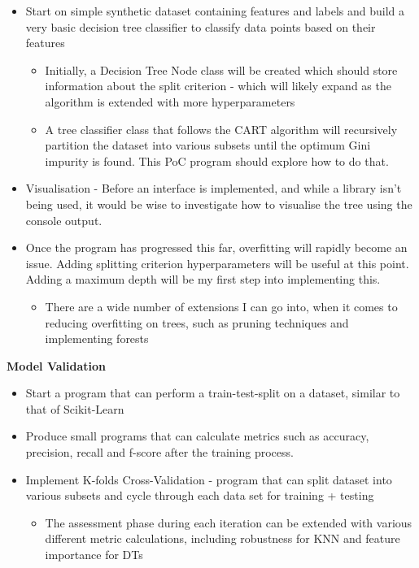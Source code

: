 \documentclass[letterpaper,10pt]{article}
\begin{document}
\begin{itemize}
    \item Start on simple synthetic dataset containing features and labels and build a very basic decision tree classifier to classify data points based on their features
    \begin{itemize}
        \item Initially, a Decision Tree Node class will be created which should store information about the split criterion - which will likely expand as the algorithm is extended with more hyperparameters
        \item A tree classifier class that follows the CART algorithm will recursively partition the dataset into various subsets until the optimum Gini impurity is found. This PoC program should explore how to do that.
    \end{itemize}
    \item Visualisation - Before an interface is implemented, and while a library isn't being used, it would be wise to investigate how to visualise the tree using the console output.
    \item Once the program has progressed this far, overfitting will rapidly become an issue. Adding splitting criterion hyperparameters will be useful at this point. Adding a maximum depth will be my first step into implementing this.
    \begin{itemize}
        \item There are a wide number of extensions I can go into, when it comes to reducing overfitting on trees, such as pruning techniques and implementing forests
    \end{itemize}
\end{itemize}
\textbf{Model Validation}
\begin{itemize}
    \item Start a program that can perform a train-test-split on a dataset, similar to that of Scikit-Learn
    \item Produce small programs that can calculate metrics such as accuracy, precision, recall and f-score after the training process.
    \item Implement K-folds Cross-Validation - program that can split dataset into various subsets and cycle through each data set for training + testing
    \begin{itemize}
        \item The assessment phase during each iteration can be extended with various different metric calculations, including robustness for KNN and feature importance for DTs
    \end{itemize}
\end{itemize}
\end{document}
